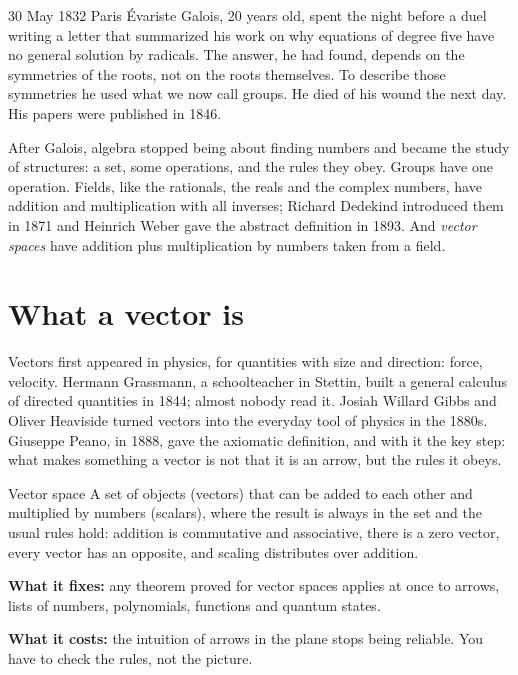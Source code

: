 \begin{history}{30 May 1832 \textperiodcentered{} Paris}
Évariste Galois, 20 years old, spent the night before a duel writing a letter that
summarized his work on why equations of degree five have no general solution by
radicals. The answer, he had found, depends on the symmetries of the roots, not
on the roots themselves. To describe those symmetries he used what we now call
groups. He died of his wound the next day. His papers were published in 1846.
\end{history}

After Galois, algebra stopped being about finding numbers and became the study of
structures: a set, some operations, and the rules they obey. Groups have one
operation. Fields, like the rationals, the reals and the complex numbers, have
addition and multiplication with all inverses; Richard Dedekind introduced them
in 1871 and Heinrich Weber gave the abstract definition in 1893. And
\emph{vector spaces} have addition plus multiplication by numbers taken from a
field.

\section{What a vector is}

Vectors first appeared in physics, for quantities with size and direction: force,
velocity. Hermann Grassmann, a schoolteacher in Stettin, built a general calculus
of directed quantities in 1844; almost nobody read it. Josiah Willard Gibbs and
Oliver Heaviside turned vectors into the everyday tool of physics in the 1880s.
Giuseppe Peano, in 1888, gave the axiomatic definition, and with it the key
step: what makes something a vector is not that it is an arrow, but the rules it
obeys.

\begin{concept}{Vector space}
A set of objects (vectors) that can be added to each other and multiplied by
numbers (scalars), where the result is always in the set and the usual rules
hold: addition is commutative and associative, there is a zero vector, every
vector has an opposite, and scaling distributes over addition.

\textbf{What it fixes:} any theorem proved for vector spaces applies at once to
arrows, lists of numbers, polynomials, functions and quantum states.

\textbf{What it costs:} the intuition of arrows in the plane stops being reliable.
You have to check the rules, not the picture.
\end{concept}

